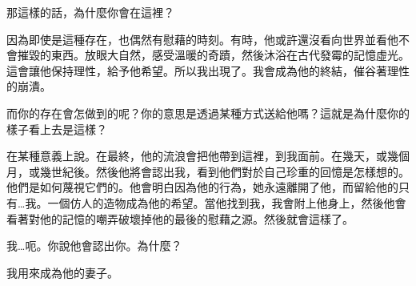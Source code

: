 \begin{scpbox}
那這樣的話，為什麼你會在這裡？

因為即使是這種存在，也偶然有慰藉的時刻。有時，他或許還沒看向世界並看他不會摧毀的東西。放眼大自然，感受溫暖的奇蹟，然後沐浴在古代發霉的記憶虛光。這會讓他保持理性，給予他希望。所以我出現了。我會成為他的終結，催谷著理性的崩潰。

而你的存在會怎做到的呢？你的意思是透過某種方式送給他嗎？這就是為什麼你的樣子看上去是這樣？

在某種意義上說。在最終，他的流浪會把他帶到這裡，到我面前。在幾天，或幾個月，或幾世紀後。然後他將會認出我，看到他們對於自己珍重的回憶是怎樣想的。他們是如何蔑視它們的。他會明白因為他的行為，她永遠離開了他，而留給他的只有…我。一個仿人的造物成為他的希望。當他找到我，我會附上他身上，然後他會看著對他的記憶的嘲弄破壞掉他的最後的慰藉之源。然後就會這樣了。

我…呃。你說他會認出你。為什麼？

我用來成為他的妻子。


\end{scpbox}



